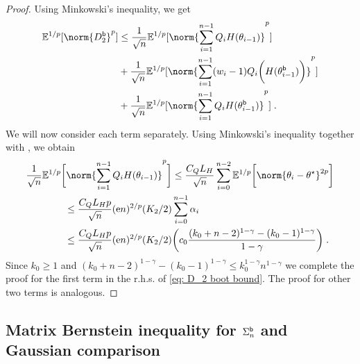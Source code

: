 \begin{proof}
 Using Minkowski's inequality, we get 
 \begin{equation}
     \label{eq: D_2 boot bound}
 \begin{split}
          \PE^{1/p}[\norm{D_2^{\boot}}^p] &\leq \frac{1}{\sqrt{n}}\PE^{1/p}[\norm{\sum_{i=1}^{n-1}Q_i H(\theta_{i-1})}^p]\\& +\frac{1}{\sqrt{n}}\PE^{1/p}[\norm{\sum_{i=1}^{n-1}(w_i-1) Q_{i}\biggl(H(\theta_{i-1}^{\boot})\biggr)}^p]\\
     &+ \frac{1}{\sqrt{n}}\PE^{1/p}[\norm{\sum_{i=1}^{n-1}Q_iH(\theta_{i-1}^{\boot})}^p]\eqsp. 
     \end{split}
\end{equation}
We will now consider each term separately.
   Using Minkowski's inequality together with , we obtain 
   \begin{equation}
   \begin{split}
       &\frac{1}{\sqrt{n}}\PE^{1/p}\biggl[\norm{\sum_{i=1}^{n-1}Q_iH(\theta_{i-1})}^{p}\biggr] \leq \frac{C_QL_H}{\sqrt{n}}\sum_{i=0}^{n-2}\PE^{1/p}\biggl[\norm{\theta_{i}-\thetas}^{2p}\biggr] \\&\qquad \qquad\leq \frac{C_QL_Hp}{\sqrt{n}}(\rme n)^{2/p}(K_2/2)\sum_{i=0}^{n-1}\alpha_i \\&\qquad \qquad \leq \frac{C_QL_Hp}{\sqrt{n}}(\rme n)^{2/p}(K_2/2)\biggl(c_0\frac{(k_0+n-2)^{1-\gamma}-(k_0-1)^{1-\gamma}}{1-\gamma} \biggr)\eqsp.
       \end{split}
   \end{equation}
   Since $k_0 \geq 1$ and $(k_0+n-2)^{1-\gamma}-(k_0-1)^{1-\gamma}\leq k_0^{1-\gamma}n^{1-\gamma}$ we complete the proof for the first term in the r.h.s. of \eqref{eq: D_2 boot bound}. The proof for other two terms is analogous.
\end{proof}


\subsection{Matrix Bernstein inequality for $
\Sigma_n^{\mathsf{b}}$ and Gaussian comparison}

